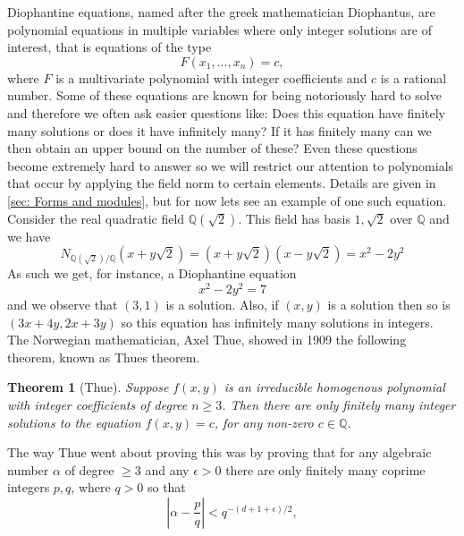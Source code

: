 \documentclass{article}
\newtheorem{theorem}{Theorem}[section]
\newcommand{\mbb}[1]{\mathbb{#1}}
\numberwithin{equation}{section}
\begin{document}
Diophantine equations, named after the greek mathematician Diophantus, are polynomial equations in multiple variables where only integer solutions are of interest, that is equations of the type 
\begin{equation}\label{eq: General diophantine equation}
    F(x_1, ..., x_n) = c,
\end{equation}
where $F$ is a multivariate polynomial with integer coefficients and $c$ is a rational number. Some of these equations are known for being notoriously hard to solve and therefore we often ask easier questions like: Does this equation have finitely many solutions or does it have infinitely many? If it has finitely many can we then obtain an upper bound on the number of these? Even these questions become extremely hard to answer so we will restrict our attention to polynomials that occur by applying the field norm to certain elements. Details are given in \cref{sec: Forms and modules}, but for now lets see an example of one such equation. Consider the real quadratic field $\mbb Q(\sqrt 2)$. This field has basis $1,\sqrt 2$ over $\mbb Q$ and we have
$$N_{\mbb Q(\sqrt 2)/\mbb Q}(x + y\sqrt 2) = (x + y\sqrt 2)(x - y\sqrt 2) = x^2 - 2y^2$$
As such we get, for instance, a Diophantine equation
$$x^2 - 2y^2 = 7$$
and we observe that $(3,1)$ is a solution. Also, if $(x,y)$ is a solution then so is $(3x + 4y, 2x + 3y)$ so this equation has infinitely many solutions in integers. The Norwegian mathematician, Axel Thue, showed in 1909 the following theorem, known as Thues theorem. 
\begin{theorem}[Thue]\label{thm: Thues theorem introduction}
    Suppose $f(x,y)$ is an irreducible homogenous polynomial with integer coefficients of degree $n \geq 3$. Then there are only finitely many integer solutions to the equation $f(x,y) = c$, for any non-zero $c \in \mbb{Q}$.
\end{theorem}
The way Thue went about proving this was by proving that for any algebraic number $\alpha$ of degree $\geq 3$ and any $\epsilon > 0$ there are only finitely many coprime integers $p,q$, where $q > 0$ so that 
$$|\alpha - \frac{p}{q}| < q^{-(d+1+\epsilon)/2},$$
\end{document}
